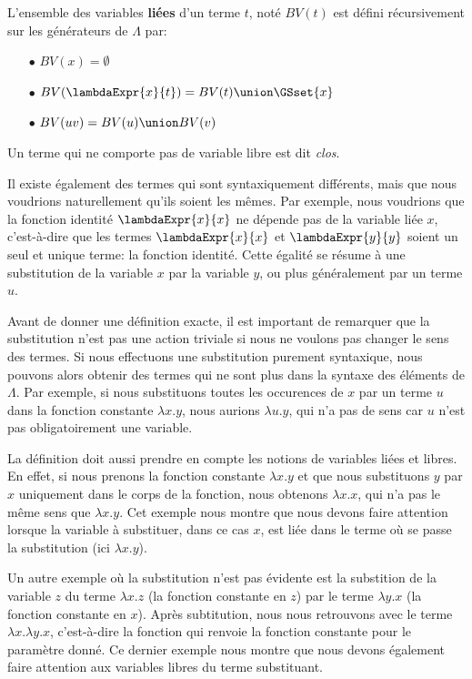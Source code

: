 \begin{definition} 
  L'ensemble des variables \textbf{liées} d'un terme $t$, noté $BV(t)$ est défini
  récursivement sur les générateurs de $\Lambda$ par:
  \begin{itemize}
  \item[$\bullet$] $BV(x) = \emptyset$
  \item[$\bullet$] $BV(\lambdaExpr{x}{t}) = BV(t) \union \GSset{x}$
  \item[$\bullet$] $BV(u v) = BV(u) \union BV(v)$
  \end{itemize}
\end{definition}

Un terme qui ne comporte pas de variable libre est dit \textit{clos}.

Il existe également des termes qui sont syntaxiquement différents, mais que nous
voudrions naturellement qu'ils soient les mêmes. Par exemple, nous voudrions que
la fonction identité $\lambdaExpr{x}{x}$ ne dépende pas de la variable liée $x$,
c'est-à-dire que les termes $\lambdaExpr{x}{x}$ et $\lambdaExpr{y}{y}$ soient un seul et
unique terme: la fonction identité. Cette égalité se résume à une substitution
de la variable $x$ par la variable $y$, ou plus généralement par un terme $u$.

Avant de donner une définition exacte, il est important de remarquer que la
substitution n'est pas une action triviale si nous ne voulons pas changer le
sens des termes. Si nous effectuons une
substitution purement syntaxique, nous pouvons alors obtenir des termes qui ne sont
plus dans la syntaxe des éléments de $\Lambda$. Par exemple, si nous
substituons toutes les occurences de $x$ par un terme $u$ dans la fonction constante
$\lambda x . y$, nous aurions $\lambda u . y$, qui n'a pas de sens car $u$ n'est
pas obligatoirement une variable.

La définition doit aussi prendre en compte les notions de variables liées et libres. En effet, si nous
prenons la fonction constante $\lambda x . y$ et que nous substituons $y$ par 
$x$ uniquement dans le corps de la fonction, nous obtenons $\lambda x . x$, qui
n'a pas le même sens que $\lambda x . y$. Cet exemple nous montre que nous
devons faire attention lorsque la variable à substituer, dans ce cas $x$, est
liée dans le terme où se passe la substitution (ici $\lambda x . y$).

Un autre exemple où la substitution n'est pas évidente est la substition de la
variable $z$ du terme $\lambda x . z$ (la fonction constante en $z$) par le terme
$\lambda y . x$ (la fonction constante en $x$). Après subtitution, nous nous
retrouvons avec le terme $\lambda x . \lambda y . x$, c'est-à-dire la fonction
qui renvoie la fonction constante pour le paramètre donné. Ce dernier exemple
nous montre que nous devons également faire attention aux variables libres du
terme substituant.

